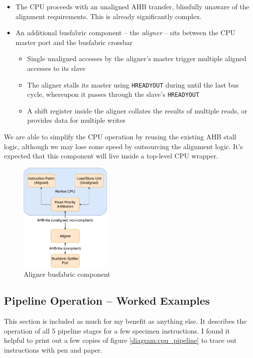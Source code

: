 \documentclass{article}
\begin{document}
\begin{itemize}
	\item The CPU proceeds with an unaligned AHB transfer, blissfully unaware of the alignment requirements. This is already significantly complex.
	\item An additional busfabric component -- the \textit{aligner} -- sits between the CPU master port and the busfabric crossbar
	\begin{itemize}
		\item Single unaligned accesses by the aligner's master trigger multiple aligned accesses to its slave
		\item The aligner stalls its master using \texttt{HREADYOUT} during until the last bus cycle, whereupon it passes through the slave's \texttt{HREADYOUT}
		\item A shift register inside the aligner collates the results of multiple reads, or provides data for multiple writes
	\end{itemize}
\end{itemize}

We are able to simplify the CPU operation by reusing the existing AHB stall logic, although we may lose some speed by outsourcing the alignment logic. It's expected that this component will live inside a top-level CPU wrapper.

\begin{figure}[!htb]
\centering
\label{diagram:unaligned_accesses}
\caption{Aligner busfabric component}
\includegraphics[width=0.4\textwidth]{diagrams/unaligned_accesses.pdf}
\end{figure}

\subsection{Pipeline Operation -- Worked Examples}

This section is included as much for my benefit as anything else. It describes the operation of all 5 pipeline stages for a few specimen instructions. I found it helpful to print out a few copies of figure \ref{diagram:cpu_pipeline} to trace out instructions with pen and paper.
\end{document}
